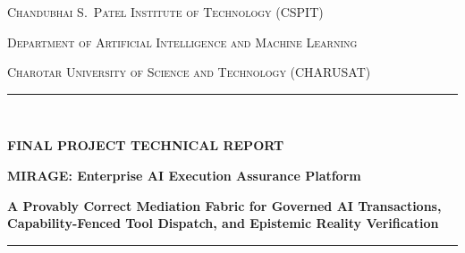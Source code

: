 \documentclass[11pt,a4paper]{article}
\begin{document}


\begin{titlepage}
\thispagestyle{empty}
\centering
\vspace*{0.2cm}
{\Large\scshape Chandubhai S.\ Patel Institute of Technology (CSPIT)\par}
\vspace{0.15cm}
{\large\scshape Department of Artificial Intelligence and Machine Learning\par}
\vspace{0.15cm}
{\normalsize\scshape Charotar University of Science and Technology (CHARUSAT)\par}
\vspace{0.6cm}

{\color{primarynavy}\rule{\linewidth}{1.5pt}}\\[0.4cm]
{\sffamily\huge\bfseries\color{primarynavy} FINAL PROJECT TECHNICAL REPORT\par}
\vspace{0.3cm}
{\sffamily\Large\bfseries\color{accentteal} MIRAGE: Enterprise AI Execution Assurance Platform\par}
\vspace{0.2cm}
{\normalsize\color{darkslate}\textbf{A Provably Correct Mediation Fabric for Governed AI Transactions, Capability-Fenced Tool Dispatch, and Epistemic Reality Verification}\par}
\vspace{0.3cm}
{\color{primarynavy}\rule{\linewidth}{1.5pt}}\\[0.5cm]



\end{titlepage}
\end{document}
